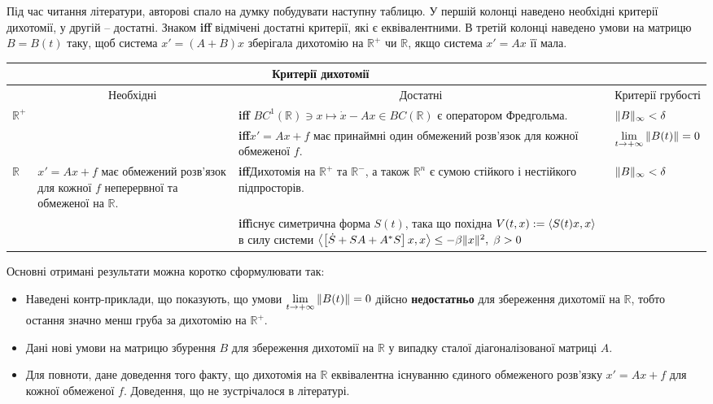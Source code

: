 \documentclass[14pt]{extarticle} %
\begin{document}
Під час читання літератури, авторові спало на думку побудувати наступну таблицю. У першій колонці наведено необхідні критерії
дихотомії, у другій -- достатні. Знаком \textbf{iff} відмічені достатні критерії, які є еквівалентними. В третій колонці
наведено умови на матрицю $B=B(t)$ таку, щоб система $x'=(A+B)x$ зберігала дихотомію на $\mathbb{R}^+$ чи $\mathbb{R}$, якщо
система $x'=Ax$ її мала.
\begin{center}
\newcommand{\mygraycenteredcell}[1]{\multicolumn{1}{c|}{\cellcolor{gray}#1}}
\newcommand{\mygraycenteredcello}{\cellcolor{gray}}

\begin{tabular}{ |l| p{} | p{} | p{}| }
	\mygraycenteredcello&\multicolumn{2}{c|}{\cellcolor{gray}Критерії дихотомії}&\mygraycenteredcello\\\hline
&\mygraycenteredcell{Необхідні}&\mygraycenteredcell{Достатні}&\mygraycenteredcell{Критерії грубості}\\\hline\hline

$\mathbb{R}^+$&
&
\textbf{iff} $BC^1(\mathbb{R})\ni x\mapsto \dot{x}-Ax\in BC(\mathbb{R})$ є оператором Фредгольма. \cite{palmer88}&
$\|B\|_\infty<\delta$ \cite{coppel}\\\hline

&
&
\textbf{iff}$x'=Ax+f$ має принаймні один обмежений розв’язок для кожної обмеженої  $f$. \cite{coppel}&
$\lim_{t\to+\infty}\mynorm{B(t)}=0$\cite{coppel}\\\hline\hline
$\mathbb{R}$&
$x'=Ax+f$ має обмежений розв’язок для кожної $f$ неперервної та обмеженої на $\mathbb{R}$.&
\textbf{iff}\qquad Дихотомія на $\mathbb{R}^+$ та $\mathbb{R}^-$, а також $\mathbb{R}^n$ є сумою стійкого і нестійкого підпросторів.
	\cite[Proposition 2.1]{palmer84} &
$\|B\|_\infty<\delta$\cite{coppel}\\\hline
&
&
\textbf{iff}існує симетрична форма $S(t)$, така що похідна $V(t,x):=\left<S(t)x,x\right>$ в силу системи
$\left<\left[\dot{S}+SA+A^*S\right]x,x\right>\leq-\beta\|x\|^2,\;\beta>0$&
\\\hline
\end{tabular}
\end{center}
Основні отримані результати можна коротко сформулювати так:
\begin{itemize}
	\item Наведені контр-приклади, що показують, що умови $\lim_{t\to+\infty}\mynorm{B(t)}=0$ дійсно \textbf{недостатньо} 
		для збереження дихотомії на $\mathbb{R}$, тобто остання значно менш груба за дихотомію на $\mathbb{R}^+$.
	\item Дані нові умови на матрицю збурення $B$ для збереження дихотомії на $\mathbb{R}$ у випадку сталої діагоналізованої
		матриці $A$.
	\item Для повноти, дане доведення того факту, що дихотомія на $\mathbb{R}$ еквівалентна існуванню єдиного обмеженого розв’язку
		$x'=Ax+f$ для кожної обмеженої $f$. Доведення, що не зустрічалося в літературі.
\end{itemize}
\end{document}
